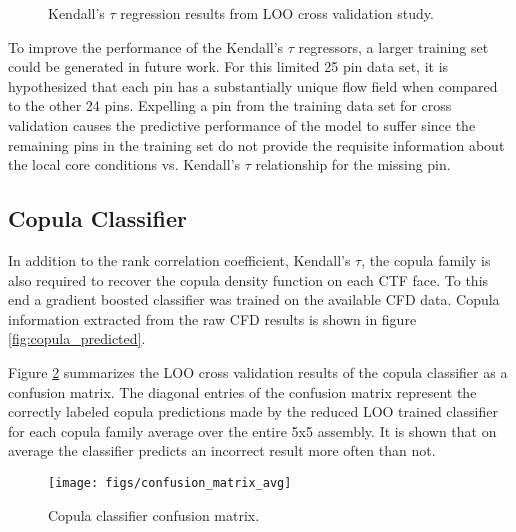 \begin{figure}[H]%
    \centering
    \qquad
    \qquad
    \qquad
    \qquad
    \caption[Kendall's $\tau$ regression LOO results.]{Kendall's $\tau$ regression results from LOO cross validation study.}%
    \label{fig:ktauregression}%
\end{figure}
To improve the performance of the Kendall's $\tau$ regressors, a larger training set could be generated in future work.  For this limited 25 pin data set, it is hypothesized that each pin has a substantially unique flow field when compared to the other 24 pins.  Expelling a pin from the training data set for cross validation causes the predictive performance of the model to suffer since the remaining pins in the training set do not provide the requisite information about the local core conditions vs. Kendall's $\tau$ relationship for the missing pin.

\subsection{Copula Classifier}

In addition to the rank correlation coefficient, Kendall's $\tau$, the copula family is also required to recover the copula density function on each CTF face.  To this end a gradient boosted classifier was trained on the available CFD data.  Copula information extracted from the raw CFD results is shown in figure \ref{fig:copula_predicted}.

Figure \ref{fig:confusionmatrixavg} summarizes the LOO cross validation results of the copula classifier as a confusion matrix.  The diagonal entries of the confusion matrix represent the correctly labeled copula predictions made by the reduced LOO trained classifier for each copula family average over the entire 5x5 assembly.  It is shown that on average the classifier predicts an incorrect result more often than not.

\begin{figure}[H]
    \centering
    \texttt{[image: figs/confusion\_matrix\_avg]}
    \caption[Copula classifier confusion matrix.]{Copula classifier confusion matrix.}
    \label{fig:confusionmatrixavg}
\end{figure}



